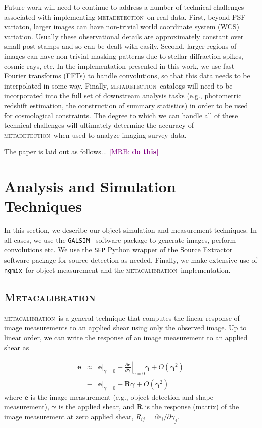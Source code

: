 \documentclass[fleqn,useAMS,usenatbib]{mnras}
\newcommand{\mrb}[1]{\textcolor{purple}{[MRB: \bf #1]}}
\newcommand{\galsim}{\texttt{GALSIM}}
\newcommand{\ngmix}{\texttt{ngmix}}
\newcommand{\mcal}{\textsc{metacalibration}}
\newcommand{\mdet}{\textsc{metadetection}}
\begin{document}
Future work will need to continue to address a number of technical challenges associated
with implementing \mdet\ on real data. First, beyond PSF variaton, larger images
can have non-trivial world coordinate system (WCS) variation. Usually these observational
details are approximately constant over small post-stamps and so can be dealt
with easily. Second, larger regions of images can have non-trivial masking
patterns due to stellar diffraction spikes, cosmic rays, etc. In the
implementation presented in this work, we use fast Fourier transforms (FFTs) to
handle convolutions, so that this data needs to be interpolated in some way.
Finally, \mdet\ catalogs will need to be incorporated into the full set of
downstream analysis tasks (e.g., photometric redshift estimation, the
construction of summary statistics) in order to be used for cosmological
constraints. The degree to which we can handle all of these technical
challenges will ultimately determine the accuracy of \mdet\ when used to analyze
imaging survey data.

The paper is laid out as follows... \mrb{do this}

\section{Analysis and Simulation Techniques}
\label{sec:sims}

In this section, we describe our object simulation and measurement techniques.
In all cases, we use the \galsim\ \citep{GALSIM2015} software package to
generate images, perform convolutions etc. We use the \texttt{SEP} \citep{sep}
Python wrapper of the Source Extractor software package \citep{Bertin96} for
source detection as needed. Finally, we make extensive use of \ngmix\ for object
measurement and the \mcal\ implementation.

\subsection{\textsc{Metacalibration}}

\mcal\ is a general technique that computes the linear response of image
measurements to an applied shear using only the observed image. Up to linear
order, we can write the response of an image measurement to an applied shear as

\begin{eqnarray}
\boldsymbol{e} & \approx & \left.\boldsymbol{e}\right|_{\gamma=0} +
                           \left.\frac{\partial \boldsymbol{e}}{\partial\boldsymbol\gamma}\right|_{\gamma=0} \boldsymbol\gamma +
                           O(\boldsymbol\gamma^2)\nonumber\\
               & \equiv  & \left.\boldsymbol{e}\right|_{\gamma=0} +
                           \boldsymbol{R} \boldsymbol\gamma +
                           O(\boldsymbol\gamma^2)
\end{eqnarray}
where $\boldsymbol{e}$ is the image measurement (e.g., object detection and shape
measurement), $\boldsymbol\gamma$ is the applied shear, and $\boldsymbol{R}$ is
the response (matrix) of the image measurement at zero applied shear,
$R_{ij}=\partial e_i /\partial \gamma_j$.
\end{document}
